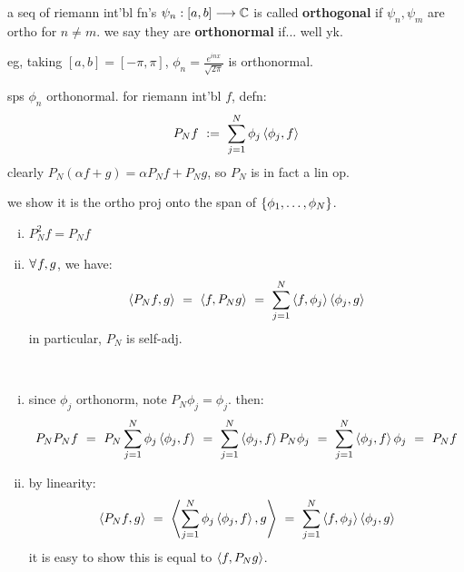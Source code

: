 \begin{defn}
	a seq of riemann int'bl fn's $\psi_{n}:[a,b]\longrightarrow\mathbb{C}$ is called \textbf{orthogonal}
	if $\psi_{n},\psi_{m}$ are ortho for $n\neq m$.
	we say they are \textbf{orthonormal} if... well yk.
\end{defn}
eg, taking $[a,b]=[-\pi,\pi]$, $\phi_{n}=\frac{e^{inx}}{\sqrt{2\pi}}$ is
orthonormal.

\begin{defn}
	sps $\phi_{n}$ orthonormal. for riemann int'bl $f$, defn:
	\begin{equation*}
		P_{N}f \ := \ \sum_{j=1}^{N}\phi_{j}\ang{\phi_{j},f}
	\end{equation*}
	clearly $P_{N}(\alpha f+g)=\alpha P_{N}f+P_{N}g$, so $P_{N}$ is in fact a lin op.
\end{defn}
we show it is the ortho proj onto the span of $\left\{{\phi_{1},\dots,\phi_{N}}\right\}$.

\begin{lm} \vspace{-0.2in}
	\begin{enumerate}[i)]
		\item $P^{2}_{N}f=P_{N}f$
		\item $\fa f,g$, we have:
			\begin{equation*}
				\left\langle{P_{N}f,g}\right\rangle \ = \ \left\langle{f,P_{N}g}\right\rangle \ = \
				\sum_{j=1}^{N}\left\langle{f,\phi_{j}}\right\rangle\left\langle{\phi_{j},g}\right\rangle
			\end{equation*}
			in particular, $P_{N}$ is self-adj.
	\end{enumerate}
\end{lm} \

\begin{pf} \vspace{-0.2in}
	\begin{enumerate}[i)]
		\item since $\phi_{j}$ orthonorm, note $P_{N}\phi_{j}=\phi_{j}$. then:
			\begin{equation*}
				P_{N}P_{N}f
				\ = \ P_{N}\sum_{j=1}^{N}\phi_{j}\left\langle{\phi_{j},f}\right\rangle
				\ = \ \sum_{j=1}^{N}\left\langle{\phi_{j},f}\right\rangle P_{N}\phi_{j}
				\ = \ \sum_{j=1}^{N}\left\langle{\phi_{j},f}\right\rangle\phi_{j}
				\ = \ P_{N}f
			\end{equation*}
		\item by linearity:
			\begin{equation*}
				\ang{P_{N}f,g}
				\ = \ \ang{\sum_{j=1}^{N}\phi_{j}\ang{\phi_{j},f},g}
				\ = \ \sum_{j=1}^{N}\ang{f,\phi_{j}}\ang{\phi_{j},g}
			\end{equation*}
			it is easy to show this is equal to $\left\langle{f,P_{N}g}\right\rangle$.
	\end{enumerate}
\end{pf} \

